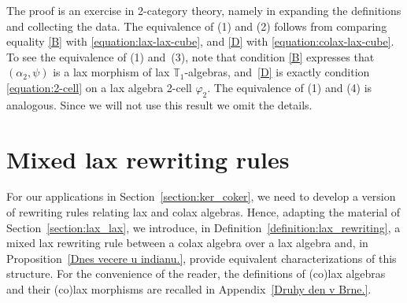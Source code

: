 \documentclass[12pt,leqno]{amsart}
\theoremstyle{definition}
\def\T{\mathbb{T}}
\newcommand{\4}{\texttt{4}}
\renewcommand{\phi}{\varphi}
\let\pf\proof
\let\epf\endproof
\begin{document}
\pf The proof is an exercise in 2-category theory, namely in expanding
the definitions and collecting the data. The equivalence of (1) and (2) follows from comparing equality \eqref{B} with \eqref{equation:lax-lax-cube}, and \eqref{D} with \eqref{equation:colax-lax-cube}. To see the equivalence of (1) and~(3),
note that condition \eqref{B} expresses that
\hbox{$(\alpha_2,\psi)$} is a lax morphism of lax
$\T_1$-algebras, and~\eqref{D} is exactly condition
\eqref{equation:2-cell} on a lax algebra 2-cell $\phi_2$. The equivalence of (1) and (4) is analogous.
Since we will not use this result we
omit the details. \epf

\section{Mixed lax rewriting rules}
\label{Zitra jedem na chalupu zase kvuli te strese.}


For our applications in Section~\ref{section:ker_coker}, we need to
develop a version of rewriting rules relating lax and colax algebras. Hence,
adapting the material of Section~\ref{section:lax_lax}, we introduce,
in Definition~\ref{definition:lax_rewriting}, 
 a mixed lax
rewriting rule between a colax algebra over a lax algebra
and, in Proposition~\ref{Dnes vecere u indianu.}, provide equivalent
characterizations of this structure.  For the convenience of
the reader, the definitions of (co)lax algebras and their
(co)lax morphisms are recalled in Appendix~\ref{Druhy den v Brne.}.
\end{document}
